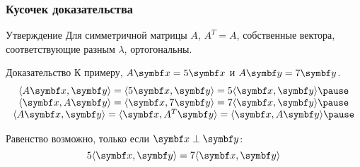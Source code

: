 \begin{frame}
    \frametitle{Кусочек доказательства}

    \begin{block}{Утверждение}
        Для симметричной матрицы $A$, $A^T=A$, собственные вектора, 
        соответствующие разным $\lambda$, ортогональны. 
    \end{block}

    \pause

\begin{block}{Доказательство}
К примеру, $A\bx = 5\bx$ и $A\by = 7\by$. \pause
\[
\begin{array}{c} 
    \langle A\bx, \by \rangle = \langle 5\bx, \by \rangle = 5 \langle \bx, \by \rangle \pause \\
    \langle \bx, A\by \rangle = \langle \bx, 7\by \rangle = 7 \langle \bx, \by \rangle \pause \\
    \langle A\bx, \by \rangle =  \langle \bx, A^T\by \rangle =  \langle \bx, A \by \rangle \pause \\
 \end{array}
\]

Равенство возможно, только если $\bx \perp \by$:
\[
    5 \langle \bx, \by \rangle = 7 \langle \bx, \by \rangle
\]

\end{block}


    

\end{frame}